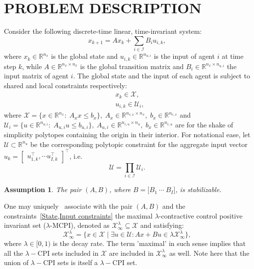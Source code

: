 \documentclass[letterpaper, 10 pt, conference]{ieeeconf}  %
\newtheorem{assumption}{Assumption}
\begin{document}
\section{PROBLEM DESCRIPTION}
Consider the following discrete-time linear, time-invariant system:
\begin{equation}\label{DT-LTI}
x_{k+1} = A x_{k} + \sum_{i \in \mathcal{I}}B_{i}u_{i,k},
\end{equation}
where $x_{k} \in \mathbb{R}^{n_x}$ is the global state and $u_{i,k} \in \mathbb{R}^{n_{u,i}}$ is the input of agent $i$ at time step $k$, while $A \in \mathbb{R}^{n_x \times n_x}$ is the global transition matrix and $B_{i} \in \mathbb{R}^{n_x \times n_{u,i}}$ the input matrix of agent $i$. The global state and the input of each agent is  subject to shared and local constraints respectively:
\begin{subequations}\label{State,Input constraints}
\begin{align}
&x_{k} \in \mathcal{X},\\
&u_{i,k} \in \mathcal{U}_{i},
\end{align}
\end{subequations}
where $\mathcal{X} = \{x \in \mathbb{R}^{n_{x}}:\; A_{x}x \leq b_{x}\},\; A_{x} \in \mathbb{R}^{n_{c,x} \times n_{x}},\; b_{x} \in \mathbb{R}^{n_{c,x}}$ and $\mathcal{U}_{i} =\{ u \in \mathbb{R}^{n_{u,i}}:\; A_{u,i}u \leq b_{u,i}\},\; A_{u,i} \in \mathbb{R}^{n_{c,u} \times n_{u}},\; b_{x} \in \mathbb{R}^{n_{c,u}}$ are for the shake of simplicity polytopes containing the origin in their interior. For notational ease, let $\mathcal{U} \subset \mathbb{R}^{n_u}$ be the corresponding polytopic constraint for the aggregate input vector $u_{k} = \begin{bmatrix} u^{\top}_{1,k}, \cdots u^{\top}_{I,k}\end{bmatrix}^{\top}$, i.e.
\begin{equation}\label{Aggregate Input constraints}
\mathcal{U} = \prod_{i\in\mathcal{I}} \mathcal{U}_{i}.
\end{equation}
\begin{assumption}\label{Stabilizability Assumption}
The pair $(A,B)$, where $B = \bigl[B_{1}\ \cdots\ B_{I} \bigr]$, is stabilizable.
\end{assumption}
One may uniquely~\cite{Kerrigan2000InvariantSetsinMPC} associate with the pair $(A,B)$ and the constraints~\eqref{State,Input constraints} the maximal $\lambda$-contractive control positive invariant set ($\lambda$-MCPI), denoted as $\mathcal{X}^{\lambda}_{\infty} \subseteq \mathcal{X}$ and satisfying:
\begin{equation}\label{λ-MCPI}
\mathcal{X}^{\lambda}_{\infty} = \{x \in \mathcal{X} \mid \exists u \in \mathcal{U} : Ax + Bu \in \lambda \mathcal{X}^{\lambda}_{\infty}\},
\end{equation}
where $\lambda \in [0, 1)$ is the decay rate. The term 'maximal' in such sense implies that all the $\lambda-$CPI sets included in $\mathcal{X}$ are included in $\mathcal{X}^{\lambda}_{\infty}$ as well. Note here that the union of $\lambda-$CPI sets is itself a $\lambda-$CPI set.
\end{document}

